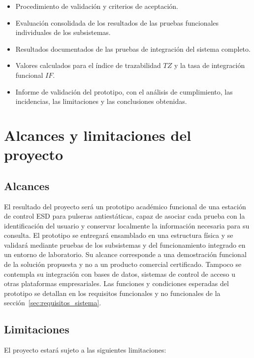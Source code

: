 \begin{itemize}
\item Procedimiento de validación y criterios de aceptación.
\item Evaluación consolidada de los resultados de las pruebas funcionales
individuales de los subsistemas.
\item Resultados documentados de las pruebas de integración del sistema
completo.
\item Valores calculados para el índice de trazabilidad \(TZ\) y la tasa de
integración funcional \(IF\).
\item Informe de validación del prototipo, con el análisis de cumplimiento, las
incidencias, las limitaciones y las conclusiones obtenidas.
\end{itemize}

\section{Alcances y limitaciones del proyecto}

\subsection{Alcances}

El resultado del proyecto será un prototipo académico funcional de una estación
de control ESD para pulseras antiestáticas, capaz de asociar cada prueba con la
identificación del usuario y conservar localmente la información necesaria para
su consulta. El prototipo se entregará ensamblado en una estructura física y se
validará mediante pruebas de los subsistemas y del funcionamiento integrado en
un entorno de laboratorio. Su alcance corresponde a una demostración funcional
de la solución propuesta y no a un producto comercial certificado. Tampoco se
contempla su integración con bases de datos, sistemas de control de acceso u
otras plataformas empresariales. Las funciones y condiciones esperadas del
prototipo se detallan en los requisitos funcionales y no funcionales de la
sección~\ref{sec:requisitos_sistema}.

\subsection{Limitaciones}

El proyecto estará sujeto a las siguientes limitaciones:

